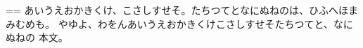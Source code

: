 \documentclass[pdflatex,tate,paper=a5,line_length=10zw]{jlreq}
\begin{document}
\setbox\@tempboxa=\vbox{\jlreq@zw\baselineskip=\baselineskip\parindent=0pt
  あいうえおかきくけ、こさしすせそ。たちつてとなにぬねのは、ひふへほまみむめも。
  やゆよ、わをんあいうえおかきくけこさしすせそたちつてと、なにぬねの}
  \showbox\@tempboxa
{}
本文。
\end{document}

